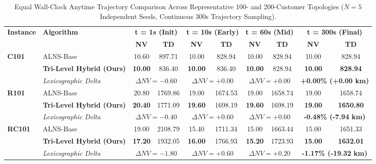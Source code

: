 \documentclass{ieeeaccess}
\begin{document}
\begin{table}[!t]
\caption{Equal Wall-Clock Anytime Trajectory Comparison Across Representative 100- and 200-Customer Topologies ($N=5$ Independent Seeds, Continuous 300s Trajectory Sampling).}
\label{tab:anytime_wallclock}
\centering
\scriptsize
\setlength{\tabcolsep}{3.5pt}
\begin{tabular*}{\textwidth}{@{\extracolsep{\fill}} ll cccccc cc @{}}
\toprule
\multirow{2}{*}{\textbf{Instance}} & \multirow{2}{*}{\textbf{Algorithm}} & \multicolumn{2}{c}{\textbf{t = 1s (Init)}} & \multicolumn{2}{c}{\textbf{t = 10s (Early)}} & \multicolumn{2}{c}{\textbf{t = 60s (Mid)}} & \multicolumn{2}{c}{\textbf{t = 300s (Final)}} \\
\cmidrule(lr){3-4} \cmidrule(lr){5-6} \cmidrule(lr){7-8} \cmidrule(lr){9-10}
 & & \textbf{NV} & \textbf{TD} & \textbf{NV} & \textbf{TD} & \textbf{NV} & \textbf{TD} & \textbf{NV} & \textbf{TD} \\
\midrule
\multirow{3}{*}{\textbf{C101}} & ALNS-Base & 10.60 & 897.71 & 10.00 & 828.94 & 10.00 & 828.94 & 10.00 & 828.94 \\
 & \textbf{Tri-Level Hybrid (Ours)} & \textbf{10.00} & 836.40 & \textbf{10.00} & 836.40 & \textbf{10.00} & 828.94 & \textbf{10.00} & \textbf{828.94} \\
 & \textit{Lexicographic Delta} & \multicolumn{2}{c}{$\Delta NV = -0.60$} & \multicolumn{2}{c}{$\Delta NV = +0.00$} & \multicolumn{2}{c}{$\Delta NV = +0.00$} & \multicolumn{2}{c}{\textbf{+0.00\% (+0.00 km)}} \\
\midrule
\multirow{3}{*}{\textbf{R101}} & ALNS-Base & 20.80 & 1769.86 & 19.00 & 1674.53 & 19.00 & 1658.74 & 19.00 & 1658.74 \\
 & \textbf{Tri-Level Hybrid (Ours)} & \textbf{20.40} & 1771.09 & \textbf{19.60} & 1698.19 & \textbf{19.60} & 1698.19 & \textbf{19.00} & \textbf{1650.80} \\
 & \textit{Lexicographic Delta} & \multicolumn{2}{c}{$\Delta NV = -0.40$} & \multicolumn{2}{c}{$\Delta NV = +0.60$} & \multicolumn{2}{c}{$\Delta NV = +0.60$} & \multicolumn{2}{c}{\textbf{-0.48\% (-7.94 km)}} \\
\midrule
\multirow{3}{*}{\textbf{RC101}} & ALNS-Base & 19.00 & 2108.79 & 15.40 & 1711.34 & 15.00 & 1663.44 & 15.00 & 1651.33 \\
 & \textbf{Tri-Level Hybrid (Ours)} & \textbf{17.20} & 1932.05 & \textbf{16.00} & 1766.93 & \textbf{15.20} & 1723.93 & \textbf{15.00} & \textbf{1632.01} \\
 & \textit{Lexicographic Delta} & \multicolumn{2}{c}{$\Delta NV = -1.80$} & \multicolumn{2}{c}{$\Delta NV = +0.60$} & \multicolumn{2}{c}{$\Delta NV = +0.20$} & \multicolumn{2}{c}{\textbf{-1.17\% (-19.32 km)}} \\

\end{tabular*}
\end{table}
\end{document}
